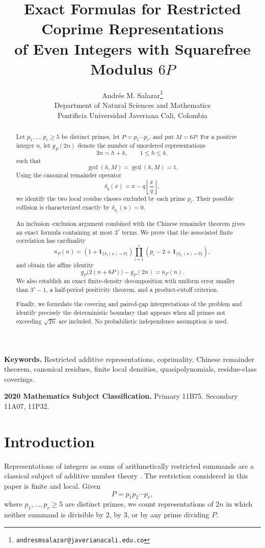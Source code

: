 \documentclass[12pt]{article}
\title{
Exact Formulas for Restricted Coprime Representations\\
of Even Integers with Squarefree Modulus
\texorpdfstring{$6P$}{6P}
}
\author{
Andr\'es M. Salazar\thanks{
\texttt{andresmsalazar@javerianacali.edu.co}
}\\
Department of Natural Sciences and Mathematics\\
Pontificia Universidad Javeriana Cali, Colombia
}
\date{}
\numberwithin{equation}{section}
\theoremstyle{definition}
\theoremstyle{remark}
\newcommand{\one}[1]{\mathbf 1_{\{#1\}}}
\begin{document}
\maketitle

\begin{abstract}
Let $p_1,\dots,p_r\geq 5$ be distinct primes, let
$P=p_1\cdots p_r$, and put $M=6P$. For a positive integer $n$,
let $g_P(2n)$ denote the number of unordered representations
\[
2n=h+k,
\qquad
1\leq h\leq k,
\]
such that
\[
\gcd(h,M)=\gcd(k,M)=1.
\]
Using the canonical remainder operator
\[
\delta_q(x)=x-q\left\lfloor\frac{x}{q}\right\rfloor,
\]
we identify the two local residue classes excluded by each prime
$p_i$. Their possible collision is characterized exactly by
$\delta_{p_i}(n)=0$.

An inclusion--exclusion argument combined with the Chinese
remainder theorem gives an exact formula containing at most
$3^r$ terms. We prove that the associated finite correlation
has cardinality
\[
\kappa_P(n)=
\left(1+\one{\delta_3(n)=0}\right)
\prod_{i=1}^{r}
\left(p_i-2+\one{\delta_{p_i}(n)=0}\right),
\]
and obtain the affine identity
\[
g_P\bigl(2(n+6P)\bigr)-g_P(2n)=\kappa_P(n).
\]
We also establish an exact finite-density decomposition with
uniform error smaller than $3^r-1$, a half-period positivity
theorem, and a product-cutoff criterion.

Finally, we formulate the covering and paired-gap interpretations
of the problem and identify precisely the deterministic boundary
that appears when all primes not exceeding $\sqrt{2n}$ are
included. No probabilistic independence assumption is used.
\end{abstract}

\medskip

\noindent
\textbf{Keywords.}
Restricted additive representations, coprimality, Chinese
remainder theorem, canonical residues, finite local densities,
quasipolynomials, residue-class coverings.

\medskip

\noindent
\textbf{2020 Mathematics Subject Classification.}
Primary 11B75.
Secondary 11A07, 11P32.

\section{Introduction}

Representations of integers as sums of arithmetically restricted
summands are a classical subject of additive number theory
\cite{Nathanson1996}.
The restriction considered in this paper is finite and local.
Given
\[
P=p_1p_2\cdots p_r,
\]
where $p_1,\dots,p_r\geq5$ are distinct primes, we count
representations of $2n$ in which neither summand is divisible
by $2$, by $3$, or by any prime dividing $P$.
\end{document}

